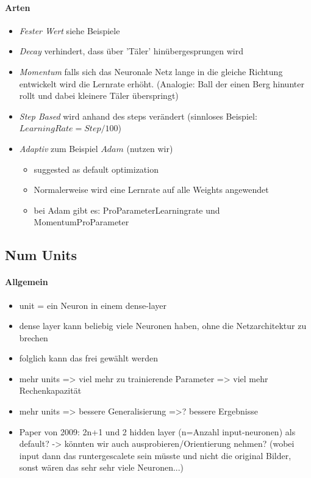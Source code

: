 \paragraph{Arten \cite{learningrate-understanding}}
\begin{itemize}
	\item \textit{Fester Wert} 
	siehe Beispiele
	
	\item \textit{Decay}
	verhindert, dass über 'Täler' hinübergesprungen wird
	
	\item \textit{Momentum}
	falls sich das Neuronale Netz lange in die gleiche Richtung entwickelt wird die Lernrate erhöht. (Analogie: Ball der einen Berg hinunter rollt und dabei kleinere Täler überspringt)
	
	\item \textit{Step Based}
	wird anhand des steps verändert (sinnloses Beispiel: $LearningRate = Step/100$)
	
	\item \textit{Adaptiv}
	zum Beispiel $Adam$ (nutzen wir) \cite{adam}
	
	\begin{itemize}
		\item suggested as default optimization
		\item Normalerweise wird eine Lernrate auf alle Weights angewendet
		\item bei Adam gibt es: ProParameterLearningrate und MomentumProParameter
	\end{itemize}
\end{itemize}


\subsection{Num Units}
\paragraph{Allgemein \cite{nodes-how-to-configure}}
\begin{itemize}
	\item unit = ein Neuron in einem dense-layer
	\item dense layer kann beliebig viele Neuronen haben, ohne die Netzarchitektur zu brechen
	\item folglich kann das frei gewählt werden
	\item mehr units => viel mehr zu trainierende Parameter => viel mehr Rechenkapazität
	\item mehr units => bessere Generalisierung =>? bessere Ergebnisse
	\item Paper von 2009: 2n+1 und 2 hidden layer (n=Anzahl input-neuronen) als default? -> könnten wir auch ausprobieren/Orientierung nehmen? (wobei input dann das runtergescalete sein müsste und nicht die original Bilder, sonst wären das sehr sehr viele Neuronen...) \cite{nodes-hiddenlayers-how-many}
\end{itemize}

